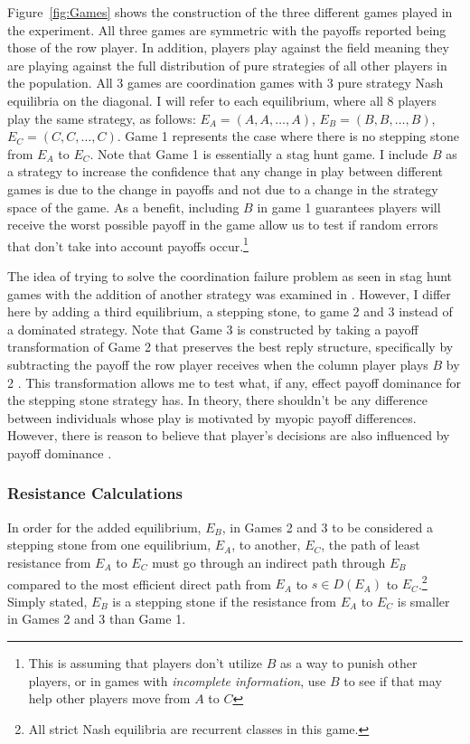 Figure~\ref{fig:Games} shows the construction of the three different games played in the experiment. All three games are symmetric with the payoffs reported being those of the row player. In addition, players play against the field meaning they are playing against the full distribution of pure strategies of all other players in the population. All 3 games are coordination games with 3 pure strategy Nash equilibria on the diagonal. I will refer to each equilibrium, where all 8 players play the same strategy, as follows: $E_A = (A, A, \dots, A)$, $E_B = (B, B, \dots, B)$, $E_C = (C, C, \dots, C)$. Game 1 represents the case where there is no stepping stone from $E_A$ to $E_C$. Note that Game 1 is essentially a stag hunt game. I include $B$ as a strategy to increase the confidence that any change in play between different games is due to the change in payoffs and not due to a change in the strategy space of the game. As a benefit, including $B$ in game 1 guarantees players will receive the worst possible payoff in the game allow us to test if random errors that don't take into account payoffs occur.\footnote{This is assuming that players don't utilize $B$ as a way to punish other players, or in games with \textit{incomplete information}, use $B$ to see if that may help other players move from $A$ to $C$}

The idea of trying to solve the coordination failure problem as seen in stag hunt games with the addition of another strategy was examined in \cite{cooper1990selection}. However, I differ here by adding a third equilibrium, a stepping stone, to game 2 and 3 instead of a dominated strategy. Note that Game 3 is constructed by taking a payoff transformation of Game 2 that preserves the best reply structure, specifically by subtracting the payoff the row player receives when the column player plays $B$ by 2 \citep{harsanyi1988general}. This transformation allows me to test what, if any, effect payoff dominance for the stepping stone strategy has. In theory, there shouldn't be any difference between individuals whose play is motivated by myopic payoff differences. However, there is reason to believe that player's decisions are also influenced by payoff dominance \citep{harsanyi1988general, jagau2022}.

\subsubsection*{Resistance Calculations}


 In order for the added equilibrium, $E_B$, in Games 2 and 3 to be considered a stepping stone from one equilibrium, $E_A$, to another, $E_C$, the path of least resistance from $E_A$ to $E_C$ must go through an indirect path through $E_B$ compared to the most efficient direct path from $E_A$ to $s \in D(E_A)$ to $E_C$.\footnote{All strict Nash equilibria are recurrent classes in this game.} Simply stated, $E_B$ is a stepping stone if the resistance from $E_A$ to $E_C$ is smaller in Games 2 and 3 than Game 1.


